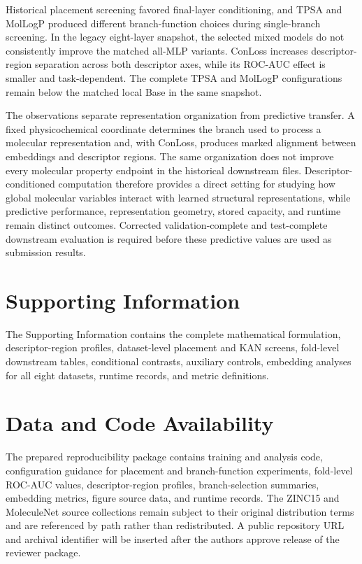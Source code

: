 \documentclass[journal=jcisd8,manuscript=article]{achemso}
\begin{document}
Historical placement screening favored final-layer conditioning, and TPSA and MolLogP produced different branch-function choices during single-branch screening. In the legacy eight-layer snapshot, the selected mixed models do not consistently improve the matched all-MLP variants. ConLoss increases descriptor-region separation across both descriptor axes, while its ROC-AUC effect is smaller and task-dependent. The complete TPSA and MolLogP configurations remain below the matched local Base in the same snapshot.

The observations separate representation organization from predictive transfer. A fixed physicochemical coordinate determines the branch used to process a molecular representation and, with ConLoss, produces marked alignment between embeddings and descriptor regions. The same organization does not improve every molecular property endpoint in the historical downstream files. Descriptor-conditioned computation therefore provides a direct setting for studying how global molecular variables interact with learned structural representations, while predictive performance, representation geometry, stored capacity, and runtime remain distinct outcomes. Corrected validation-complete and test-complete downstream evaluation is required before these predictive values are used as submission results.

\section*{Supporting Information}

The Supporting Information contains the complete mathematical formulation,
descriptor-region profiles, dataset-level placement and KAN screens,
fold-level downstream tables, conditional contrasts, auxiliary controls,
embedding analyses for all eight datasets, runtime records, and metric
definitions.

\section*{Data and Code Availability}

The prepared reproducibility package contains training and analysis code,
configuration guidance for placement and branch-function experiments,
fold-level ROC-AUC values, descriptor-region profiles, branch-selection
summaries, embedding metrics, figure source data, and runtime records. The
ZINC15 and MoleculeNet source collections remain subject to their original
distribution terms and are referenced by path rather than redistributed. A
public repository URL and archival identifier will be inserted after the
authors approve release of the reviewer package.
\end{document}
